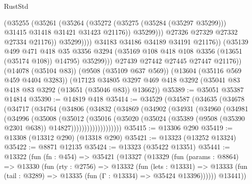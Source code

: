 \begin{lexlean}{RustStd}
\begin{coremodule}
                              (@35255
                                (@35261
                                  (@35264
                                    (@35272
                                      (@35275 (@35284 (@35297 @35299)))
                                      @31415
                                      @31418
                                      @31421
                                      @31423
                                      @21176))
                                  @35299)))
                            @27326
                            @27329
                            @27332
                            @27334
                            @21176))
                        @35299))))
                @34183
                @34186
                @34189
                @34191
                @21176))
            (@35139
              @499
              @471
              @418
              @35
              @3356
              @3294
              (@35169 @108 @418 @108 @3356 (@13651 (@35174 @108)) @14795)
              @35299)))
        @27439
        @27442
        @27445
        @27447
        @21176))
    (@14078 (@35104 @83))
    (@9508 (@35109 @637 @569))
    (@13604 (@35116 @569 @459 @4404 @3283))
    (@17123 @34805 @3297 @469 @418 @3292 (@35041 @83 @418 @83 @3292 (@13651 (@35046 @83)) @13662))
@35389 := @35051 @35387 @14814
@35390 := @14819 @418
@35414 := @34529
    (@34587
      (@34635
        (@34678
          (@34717
            (@34764
              (@34806
                (@34832
                  (@34869
                    (@34902
                      (@34931
                        (@34960
                          (@34981
                            (@34996
                              (@35008
                                (@35012
                                  (@35016
                                    (@35020
                                      (@35024
                                        (@35389
                                          (@9508 (@35390 @2301 @638))
                                          @14827)))))))))))))))))))
@35415 := @13306 @290
@35419 := @13308 (@13312 @290) (@13318 @290)
@35421 := @13323 (@13252 @13324)
@35422 := @8871 @12135
@35424 := @13323 (@35422 @13351)
@35441 := @13322
    (fun (fn : @454) =>
    @35421
      (@13327
        (@13329
          (fun (params : @8864) =>
          @13330
            (fun (rty : @2756) =>
            @13332
              (fun (lets : @13331) =>
              @13333 (fun (tail : @3289) => @13335 (fun (Γ : @13334) => @35424 @13396))))))
        @13441))

\end{coremodule}
\end{lexlean}
